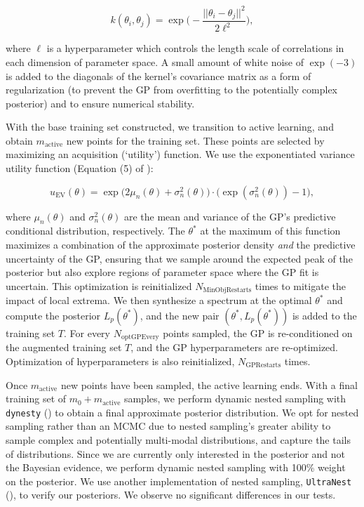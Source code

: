 \documentclass[twocolumn, twocolappendix]{aastex63}
\begin{document}
\begin{equation}\label{eqn:covariance_kernel}
    k(\theta_i, \theta_j) = \exp\Big(-\frac{||\theta_i - \theta_j||^2}{2 \ell^2}\Big),   
\end{equation}

\noindent where $\ell$ is a hyperparameter which controls the length scale of correlations in each dimension of parameter space. A small amount of white noise of $\exp(-3)$ is added to the diagonals of the kernel's covariance matrix as a form of regularization (to prevent the GP from overfitting to the potentially complex posterior) and to ensure numerical stability. 

With the base training set constructed, we transition to active learning, and obtain $m_{\mathrm{active}}$ new points for the training set. These points are selected by maximizing an acquisition (`utility') function. We use the exponentiated variance utility function (Equation (5) of \citealt{kandasamy17}):  

\begin{equation}\label{eqn:EV_utility}
    u_{\mathrm{EV}}(\theta) = \exp\big(2\mu_n(\theta) + \sigma_n^2(\theta)\big)\cdot\big(\exp(\sigma_n^2(\theta)) - 1\big),
\end{equation}
    
\noindent where $\mu_n(\theta)$ and $\sigma_n^2(\theta)$ are the mean and variance of the GP's predictive conditional distribution, respectively. The $\theta^*$ at the maximum of this function maximizes a combination of the approximate posterior density \textit{and} the predictive uncertainty of the GP, ensuring that we sample around the expected peak of the posterior but also explore regions of parameter space where the GP fit is uncertain. This optimization is reinitialized $N_{\mathrm{MinObjRestarts}}$ times to mitigate the impact of local extrema. We then synthesize a spectrum at the optimal $\theta^*$ and compute the posterior $L_p (\theta^*)$, and the new pair $(\theta^*, L_p (\theta^*))$ is added to the training set $T$. For every $N_{\mathrm{optGPEvery}}$ points sampled, the GP is re-conditioned on the augmented training set $T$, and the GP hyperparameters are re-optimized. Optimization of hyperparameters is also reinitialized, $N_{\mathrm{GPRestarts}}$ times. 

Once $m_{\mathrm{active}}$ new points have been sampled, the active learning ends. With a final training set of $m_0 + m_{\mathrm{active}}$ samples, we perform dynamic nested sampling with \texttt{dynesty} (\citealt{speagle20}) to obtain a final approximate posterior distribution. We opt for nested sampling rather than an MCMC due to nested sampling's greater ability to sample complex and potentially multi-modal distributions, and capture the tails of distributions. Since we are currently only interested in the posterior and not the Bayesian evidence, we perform dynamic nested sampling with 100\% weight on the posterior. We use another implementation of nested sampling, \texttt{UltraNest} (\citealt{buchner21}), to verify our posteriors. We observe no significant differences in our tests.
\end{document}
